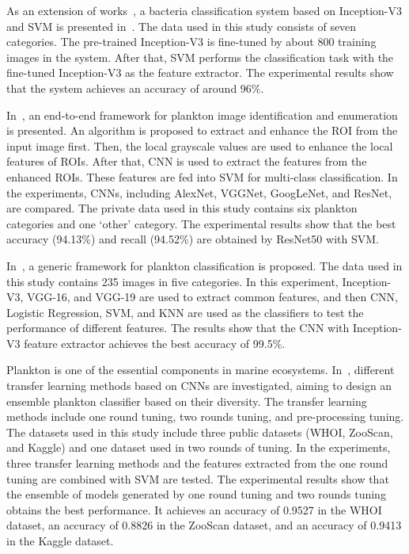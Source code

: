 As an extension of works~\cite{Wahid-2018-CMIB}, a bacteria classification system based on Inception-V3 and SVM is presented in~\cite{Ahmed-2019-CDCN}. The data used in this study consists of seven categories. The pre-trained Inception-V3 is fine-tuned by about 800 training images in the system. After that, SVM performs the classification task with the fine-tuned Inception-V3 as the feature extractor. The experimental results show that the system achieves an accuracy of around 96\%.

In~\cite{Cheng-2019-ECNN}, an end-to-end framework for plankton image identification and enumeration is presented. An algorithm is proposed to extract and enhance the ROI from the input image first. Then, the local grayscale values are used to enhance the local features of ROIs. After that, CNN is used to extract the features from the enhanced ROIs. These features are fed into SVM for multi-class classification. In the experiments, CNNs, including AlexNet, VGGNet, GoogLeNet, and ResNet, are compared. The private data used in this study contains six plankton categories and one ‘other’ category. The experimental results show that the best accuracy (94.13\%) and recall (94.52\%) are obtained by ResNet50 with SVM.

In~\cite{Rawat-2019-ADLB}, a generic framework for plankton classification is proposed. The data used in this study contains 235 images in five categories. In this experiment, Inception-V3, VGG-16, and VGG-19 are used to extract common features, and then CNN, Logistic Regression, SVM, and KNN are used as the classifiers to test the performance of different features. The results show that the CNN with Inception-V3 feature extractor achieves the best accuracy of 99.5\%.

Plankton is one of the essential components in marine ecosystems. In~\cite{Lumini-2019-DLTL}, different transfer learning methods based on CNNs are investigated, aiming to design an ensemble plankton classifier based on their diversity. The transfer learning methods include one round tuning, two rounds tuning, and pre-processing tuning. The datasets used in this study include three public datasets (WHOI, ZooScan, and Kaggle) and one dataset used in two rounds of tuning. In the experiments, three transfer learning methods and the features extracted from the one round tuning are combined with SVM are tested. The experimental results show that the ensemble of models generated by one round tuning and two rounds tuning obtains the best performance. It achieves an accuracy of 0.9527 in the WHOI dataset, an accuracy of 0.8826 in the ZooScan dataset, and an accuracy of 0.9413 in the Kaggle dataset.

